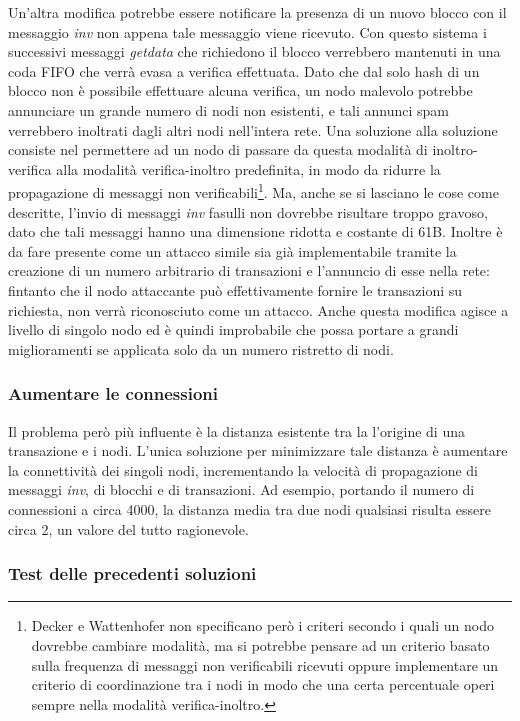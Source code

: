 Un'altra modifica potrebbe essere notificare la presenza di un nuovo blocco con il messaggio \emph{inv} non appena tale messaggio viene ricevuto. Con questo sistema i successivi messaggi \emph{getdata} che richiedono il blocco verrebbero mantenuti in una coda FIFO che verrà evasa a verifica effettuata.
Dato che dal solo hash di un blocco non è possibile effettuare alcuna verifica, un nodo malevolo potrebbe annunciare un grande numero di nodi non esistenti, e tali annunci spam verrebbero inoltrati dagli altri nodi nell'intera rete. Una soluzione alla soluzione consiste nel permettere ad un nodo di passare da questa modalità di inoltro-verifica alla modalità verifica-inoltro predefinita, in modo da ridurre la propagazione di messaggi non verificabili\footnote{Decker e Wattenhofer non specificano però i criteri secondo i quali un nodo dovrebbe cambiare modalità, ma si potrebbe pensare ad un criterio basato sulla frequenza di messaggi non verificabili ricevuti oppure implementare un criterio di coordinazione tra i nodi in modo che una certa percentuale operi sempre nella modalità verifica-inoltro.}.
Ma, anche se si lasciano le cose come descritte, l'invio di messaggi \emph{inv} fasulli non dovrebbe risultare troppo gravoso, dato che tali messaggi hanno una dimensione ridotta e costante di 61B.
Inoltre è da fare presente come un attacco simile sia già implementabile tramite la creazione di un numero arbitrario di transazioni e l'annuncio di esse nella rete: fintanto che il nodo attaccante può effettivamente fornire le transazioni su richiesta, non verrà riconosciuto come un attacco.
Anche questa modifica agisce a livello di singolo nodo ed è quindi improbabile che possa portare a grandi miglioramenti se applicata solo da un numero ristretto di nodi.

\subsubsection{Aumentare le connessioni}

Il problema però più influente è la distanza esistente tra la l'origine di una transazione e i nodi. L'unica soluzione per minimizzare tale distanza è aumentare la connettività dei singoli nodi, incrementando la velocità di propagazione di messaggi \emph{inv}, di blocchi e di transazioni. Ad esempio, portando il numero di connessioni a circa 4000, la distanza media tra due nodi qualsiasi risulta essere circa 2, un valore del tutto ragionevole.

\subsubsection{Test delle precedenti soluzioni}

